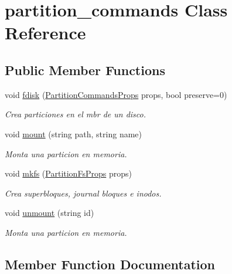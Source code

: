 \hypertarget{classpartition__commands}{}\section{partition\+\_\+commands Class Reference}
\label{classpartition__commands}
\subsection*{Public Member Functions}
\begin{DoxyCompactItemize}
\item 
void \hyperlink{classpartition__commands_abdb0958853ae256735b9165cfcbf5a69}{fdisk} (\hyperlink{structPartitionCommandsProps}{Partition\+Commands\+Props} props, bool preserve=0)
\begin{DoxyCompactList}\small\item\em Crea particiones en el mbr de un disco. \end{DoxyCompactList}\item 
void \hyperlink{classpartition__commands_aa9a9c098b234aac9cf1d42aad40b1c9f}{mount} (string path, string name)
\begin{DoxyCompactList}\small\item\em Monta una particion en memoria. \end{DoxyCompactList}\item 
void \hyperlink{classpartition__commands_a41ba9bd1dfa43993e2969caac2a52250}{mkfs} (\hyperlink{structPartitionFsProps}{Partition\+Fs\+Props} props)
\begin{DoxyCompactList}\small\item\em Crea superbloques, journal bloques e inodos. \end{DoxyCompactList}\item 
void \hyperlink{classpartition__commands_a5caa41608c247eb70a6ea8120850924d}{unmount} (string id)
\begin{DoxyCompactList}\small\item\em Monta una particion en memoria. \end{DoxyCompactList}\end{DoxyCompactItemize}


\subsection{Member Function Documentation}
\mbox{\label{classpartition__commands_abdb0958853ae256735b9165cfcbf5a69}} 
